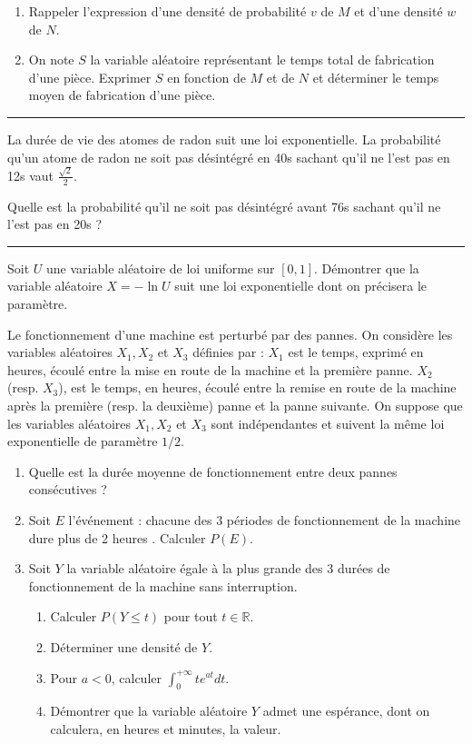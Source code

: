 \documentclass[../PolyS4.tex]{subfiles}
\begin{document}
\begin{enumerate}
\item Rappeler l'expression d'une densité de probabilité $v$ de $M$ et d'une densité $w$ de $N$.
\item On note $S$ la variable aléatoire représentant le temps total de fabrication d'une pièce. Exprimer $S$ en fonction de $M$ et de $N$ et déterminer le temps moyen de fabrication d'une pièce.
\end{enumerate}

\vspace{1em}
\hrule
\vspace{1em}


La durée de vie des atomes de radon suit une loi exponentielle. La probabilité qu'un atome de radon ne soit pas désintégré en 40s sachant qu'il ne l'est pas en 12s vaut $\frac{\sqrt{2}}{2}$. 

Quelle est la probabilité qu'il ne soit pas désintégré avant 76s sachant qu'il ne l'est pas en 20s ?

\vspace{1em}
\hrule
\vspace{1em}


Soit $U$ une variable aléatoire de loi uniforme sur $[0,1]$. Démontrer que la variable aléatoire $X=-\ln U$ suit une loi exponentielle dont on précisera le paramètre.

\newpage
{}

Le fonctionnement d'une machine est perturbé par des pannes. On considère les variables aléatoires $X_1, X_2$ et $X_3$ définies par : $X_1$ est le temps, exprimé en heures, écoulé entre la mise en route de la machine et la première panne. $X_2$ (resp. $X_3$), est le temps, en heures, écoulé entre la remise en route de la machine après la première (resp. la deuxième) panne et la panne suivante. On suppose que les variables aléatoires $X_1, X_2$ et $X_3$ sont indépendantes et suivent la même loi exponentielle de paramètre $1/2$.

\begin{enumerate}
\item Quelle est la durée moyenne de fonctionnement entre deux pannes consécutives ?
\item Soit $E$ l'événement : \og  chacune des 3 périodes de fonctionnement de la machine dure plus de 2 heures \fg{} . Calculer $P(E)$.
\item Soit $Y$ la variable aléatoire égale à la plus grande des 3 durées de fonctionnement de la machine sans interruption. 
\begin{enumerate}
\item Calculer $P(Y\leq t)$ pour tout $t\in\mathbb{R}$.
\item Déterminer une densité de $Y$.
\item Pour $a<0$, calculer $\int_0^{+\infty}te^{at}dt$.
\item Démontrer que la variable aléatoire $Y$ admet une espérance, dont on calculera, en heures et minutes, la valeur.
\end{enumerate}
\end{enumerate}
\end{document}
